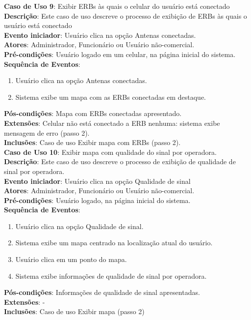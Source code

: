 \documentclass[]{politex}
\begin{document}
\noindent \textbf{Caso de Uso 9}: Exibir ERBs às quais o celular do usuário está
conectado \\
\textbf{Descrição}: Este caso de uso descreve o processo de exibição de ERBs às
quais o usuário está conectado \\
\textbf{Evento iniciador}: Usuário clica na opção Antenas conectadas. \\
\textbf{Atores}: Administrador, Funcionário ou Usuário não-comercial. \\
\textbf{Pré-condições}: Usuário logado em um celular, na página inicial do
sistema. \\
\textbf{Sequência de Eventos}:
\begin{enumerate}
\item Usuário clica na opção Antenas conectadas.
\item Sistema exibe um mapa com as ERBs conectadas em destaque.
\end{enumerate}
\textbf{Pós-condições}: Mapa com ERBs conectadas apresentado. \\
\textbf{Extensões}: Celular não está conectado a ERB nenhuma: sistema exibe 
mensagem de erro (passo 2). \\
\textbf{Inclusões}: Caso de uso Exibir mapa com ERBs (passo 2). \\

\noindent \textbf{Caso de Uso 10}: Exibir mapa com qualidade do sinal por 
operadora. \\
\textbf{Descrição}: Este caso de uso descreve o processo de exibição de
qualidade de sinal por operadora. \\
\textbf{Evento iniciador}: Usuário clica na opção Qualidade de sinal \\
\textbf{Atores}: Administrador, Funcionário ou Usuário não-comercial. \\
\textbf{Pré-condições}: Usuário logado, na página inicial do sistema. \\
\textbf{Sequência de Eventos}:
\begin{enumerate}
\item Usuário clica na opção Qualidade de sinal.
\item Sistema exibe um mapa centrado na localização atual do usuário.
\item Usuário clica em um ponto do mapa.
\item Sistema exibe informações de qualidade de sinal por operadora.
\end{enumerate}
\textbf{Pós-condições}: Informações de qualidade de sinal apresentadas. \\
\textbf{Extensões}: - \\
\textbf{Inclusões}: Caso de uso Exibir mapa (passo 2) \\
\end{document}
